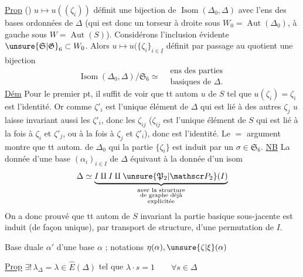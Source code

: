 \uline{Prop} () $u\mapsto u((\zeta_i))$ définit une  bijection de $\operatorname{Isom}(\Delta_0,\Delta)$ avec l'ens des bases ordonnées de $\Delta$ (qui est donc un torseur à droite sous $W_0=\operatorname{Aut}(\Delta_0)$, à gauche sous $W=\operatorname{Aut}(S)$). Considérons l'inclusion évidente $\unsure{\mathfrak S|\mathfrak G}_6\subset W_0$. Alors $u\mapsto u(\{\zeta_i\}_{i\in\underline I}$ définit par passage au quotient une bijection
\[
\operatorname{Isom}(\Delta_0,\Delta)/\mathfrak S_6\simeq
\begin{aligned}&\text{ens des parties}\\&\text{basiques de }\Delta.\end{aligned}
\]
\uline{Dém} Pour le premier pt, il suffit de voir que tt autom $u$ de $S$ tel que $u(\zeta_i)=\zeta_i$  est l'identité. Or comme $\zeta'_i$ est l'unique élément de $\Delta$  qui  est lié à   des autres $\zeta_j$  $u$ laisse invariant aussi les $\zeta'_i$, donc les $\zeta_{ij}$ ($\zeta_{ij}$ est l'unique élément de $S$ qui est lié à la fois à $\zeta_i$ et $\zeta'_j$, ou à la fois à $\zeta_j$ et $\zeta'_i$), donc est l'identité.  Le $=$ argument montre que tt autom. de $\Delta_0$ qui  la partie $\{\zeta_i\}$ est induit par un $\sigma\in\mathfrak S_6$.
\uline{NB} La donnée d'une base $(\alpha_i)_{i\in I}$ de $\Delta$ équivaut à la donnée d'un isom
\[
\Delta\simeq\underbrace{I\amalg I\amalg\unsure{\mathfrak P_2|\mathscr P_2}(I)}_{\substack{\text{avec la structure}\\\text{de graphe déjà}\\\text{explicitée}}}
\]
On a donc prouvé que tt autom de $S$ invariant  la partie basique sous-jacente est induit (de façon unique), par  transport de structure, d'une permutation de $I$.

Base duale $\alpha'$ d'une base $\alpha$ ; notations $\eta(\alpha),\unsure{\zeta|\xi}(\alpha)$

\uline{Prop} $\exists!\,\lambda_\Delta=\lambda\in\widehat E(\Delta)$ tel que $\boxed{\lambda\cdot s=1\qquad\forall s\in\Delta}$

